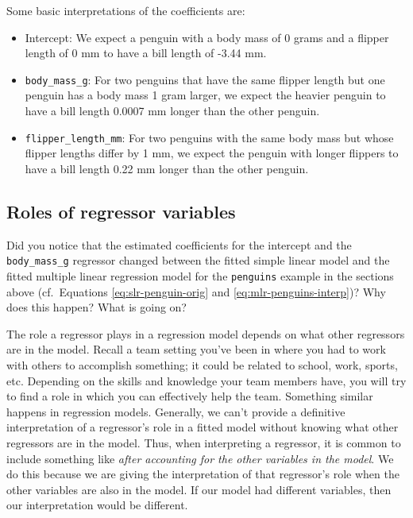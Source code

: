 \documentclass[
]{book}
\providecommand{\tightlist}{%
  \setlength{\itemsep}{0pt}\setlength{\parskip}{0pt}}
\theoremstyle{definition}
\theoremstyle{definition}
\theoremstyle{definition}
\theoremstyle{definition}
\theoremstyle{remark}
\begin{document}
Some basic interpretations of the coefficients are:

\begin{itemize}
\tightlist
\item
  Intercept: We expect a penguin with a body mass of 0 grams and a
  flipper length of 0 mm to have a bill length of -3.44 mm.
\item
  \texttt{body\_mass\_g}: For two penguins that have the same flipper length but one penguin has a body mass 1 gram larger, we expect the heavier penguin to have a bill length 0.0007 mm longer than the other penguin.
\item
  \texttt{flipper\_length\_mm}: For two penguins with the same body mass but whose flipper lengths differ by 1 mm, we expect the penguin with longer flippers to have a bill length 0.22 mm longer than the other penguin.
\end{itemize}

\hypertarget{regressor-roles}{%
\subsection{Roles of regressor variables}\label{regressor-roles}}

Did you notice that the estimated coefficients for the intercept and the
\texttt{body\_mass\_g} regressor changed between the fitted simple linear model
and the fitted multiple linear regression model for the \texttt{penguins}
example in the sections above (cf.~Equations \eqref{eq:slr-penguin-orig}
and \eqref{eq:mlr-penguins-interp})? Why does this happen? What is going
on?

The role a regressor plays in a regression model depends on what other
regressors are in the model. Recall a team setting you've been in where
you had to work with others to accomplish something; it could be related
to school, work, sports, etc. Depending on the skills and knowledge your
team members have, you will try to find a role in which you can
effectively help the team. Something similar happens in regression
models. Generally, we can't provide a definitive interpretation of a
regressor's role in a fitted model without knowing what other regressors
are in the model. Thus, when interpreting a regressor, it is common to
include something like \emph{after accounting for the other variables in
the model}. We do this because we are giving the interpretation of that
regressor's role when the other variables are also in the model. If our
model had different variables, then our interpretation would be
different.
\end{document}
